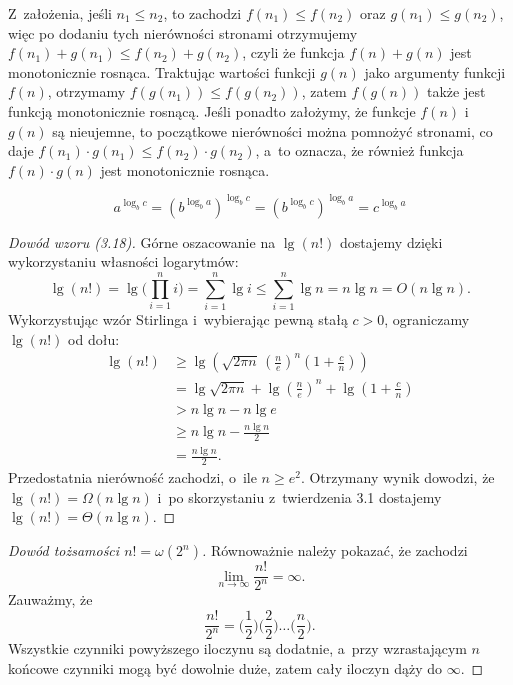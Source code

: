 
\exercise %
Z~założenia, jeśli $n_1\le n_2$, to zachodzi $f(n_1)\le f(n_2)$ oraz $g(n_1)\le g(n_2)$, więc po dodaniu tych nierówności stronami otrzymujemy $f(n_1)+g(n_1)\le f(n_2)+g(n_2)$, czyli że funkcja $f(n)+g(n)$ jest monotonicznie rosnąca.
Traktując wartości funkcji $g(n)$ jako argumenty funkcji $f(n)$, otrzymamy $f(g(n_1))\le f(g(n_2))$, zatem $f(g(n))$ także jest funkcją monotonicznie rosnącą.
Jeśli ponadto założymy, że funkcje $f(n)$ i~$g(n)$ są nieujemne, to początkowe nierówności można pomnożyć stronami, co daje $f(n_1)\cdot g(n_1)\le f(n_2)\cdot g(n_2)$, a~to oznacza, że również funkcja $f(n)\cdot g(n)$ jest monotonicznie rosnąca.

\exercise %
\[
	a^{\log_bc} = \left(b^{\log_ba}\right)^{\log_bc} = \left(b^{\log_bc}\right)^{\log_ba} = c^{\log_ba}
\]

\exercise %
\begin{proof}[Dowód wzoru (3.18)]
	Górne oszacowanie na $\lg(n!)$ dostajemy dzięki wykorzystaniu własności logarytmów:
	\[
	    \lg(n!) = \lg\biggl(\prod_{i=1}^ni\biggr) = \sum_{i=1}^n\lg i \le \sum_{i=1}^n\lg n = n\lg n = O(n\lg n).
	\]
	Wykorzystując wzór Stirlinga i~wybierając pewną stałą $c>0$, ograniczamy $\lg(n!)$ od dołu:
	\begin{align*}
		\lg(n!) &\ge \lg\left(\!\sqrt{2\pi n}\,\left(\frac{n}{e}\right)^n\left(1+\frac{c}{n}\right)\right) \\
		&= \lg\sqrt{2\pi n}+\lg\left(\frac{n}{e}\right)^n+\lg\left(1+\frac{c}{n}\right) \\
		&> n\lg n-n\lg e \\
		&\ge n\lg n-\frac{n\lg n}{2} \\
		&= \frac{n\lg n}{2}.
	\end{align*}
	Przedostatnia nierówność zachodzi, o~ile $n\ge e^2$.
Otrzymany wynik dowodzi, że $\lg(n!)=\Omega(n\lg n)$ i~po skorzystaniu z~twierdzenia 3.1 dostajemy $\lg(n!)=\Theta(n\lg n)$.
\end{proof}

\begin{proof}[Dowód tożsamości $n!=\omega(2^n)$]
	Równoważnie należy pokazać, że zachodzi
	\[
		\lim_{n\to\infty}\frac{n!}{2^n} = \infty.
	\]
	Zauważmy, że
	\[
	    \frac{n!}{2^n} = \biggl(\frac{1}{2}\biggr)\biggl(\frac{2}{2}\biggr)\dots\biggl(\frac{n}{2}\biggr).
	\]
	Wszystkie czynniki powyższego iloczynu są dodatnie, a~przy wzrastającym $n$ końcowe czynniki mogą być dowolnie duże, zatem cały iloczyn dąży do $\infty$.
\end{proof}


